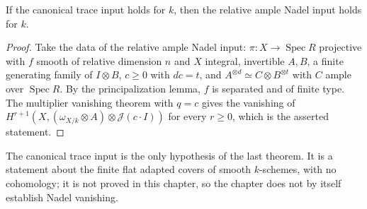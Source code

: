 \begin{theorem}
\label{thm:kn-relative-ample-nadel-of-cover-trace}
\leanok
If the canonical trace input holds for $k$, then the relative ample Nadel input
holds for $k$.
\end{theorem}
\begin{proof}
Take the data of the relative ample Nadel input: $\pi:X\to\operatorname{Spec}R$
projective with $f$ smooth of relative dimension $n$ and $X$ integral,
invertible $A,B$, a finite generating family of $I\otimes B$, $c\geq0$ with
$dc=t$, and $A^{\otimes d}\simeq C\otimes B^{\otimes t}$ with $C$ ample over
$\operatorname{Spec}R$. By the principalization lemma, $f$ is separated and of
finite type. The multiplier vanishing theorem with $q=c$ gives the vanishing
of $H^{r+1}(X,(\omega_{X/k}\otimes A)\otimes\mathcal J(c\cdot I))$ for every
$r\geq0$, which is the asserted statement.
\end{proof}

\begin{remark}
The canonical trace input is the only hypothesis of the last theorem. It is a
statement about the finite flat adapted covers of smooth $k$-schemes, with
no cohomology; it is not proved in this chapter, so the chapter does not by
itself establish Nadel vanishing.
\end{remark}
